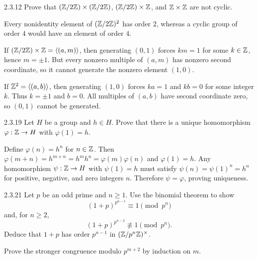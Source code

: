 \documentclass[11pt,oneside]{article}
\begin{document}
\begin{exercise}{2.3.12}
Prove that $(\mathbb{Z}/2\mathbb{Z})\times(\mathbb{Z}/2\mathbb{Z})$, $(\mathbb{Z}/2\mathbb{Z})\times\mathbb{Z}$, and $\mathbb{Z}\times\mathbb{Z}$ are not cyclic.
\end{exercise}

\begin{solution}
\begin{exercisesubparts}
\item Every nonidentity element of $(\mathbb{Z}/2\mathbb{Z})^2$ has order $2$, whereas a cyclic group of order $4$ would have an element of order $4$.
\item If $(\mathbb{Z}/2\mathbb{Z})\times\mathbb{Z}=\langle(a,m)\rangle$, then generating $(0,1)$ forces $km=1$ for some $k\in\mathbb{Z}$, hence $m=\pm1$. But every nonzero multiple of $(a,m)$ has nonzero second coordinate, so it cannot generate the nonzero element $(1,0)$.
\item If $\mathbb{Z}^2=\langle(a,b)\rangle$, then generating $(1,0)$ forces $ka=1$ and $kb=0$ for some integer $k$. Thus $k=\pm1$ and $b=0$. All multiples of $(a,b)$ have second coordinate zero, so $(0,1)$ cannot be generated.
\end{exercisesubparts}
\end{solution}

\begin{exercise}{2.3.19}
Let $H$ be a group and $h\in H$. Prove that there is a unique homomorphism $\varphi:\mathbb{Z}\to H$ with $\varphi(1)=h$.
\end{exercise}

\begin{solution}
Define $\varphi(n)=h^n$ for $n\in\mathbb{Z}$. Then $\varphi(m+n)=h^{m+n}=h^mh^n=\varphi(m)\varphi(n)$ and $\varphi(1)=h$. Any homomorphism $\psi:\mathbb{Z}\to H$ with $\psi(1)=h$ must satisfy $\psi(n)=\psi(1)^n=h^n$ for positive, negative, and zero integers $n$. Therefore $\psi=\varphi$, proving uniqueness.
\end{solution}

\begin{exercise}{2.3.21}
Let $p$ be an odd prime and $n\ge1$. Use the binomial theorem to show
\[
 (1+p)^{p^{n-1}}\equiv1\pmod{p^n}
\]
and, for $n\ge2$,
\[
 (1+p)^{p^{n-2}}\not\equiv1\pmod{p^n}.
\]
Deduce that $1+p$ has order $p^{n-1}$ in $(\mathbb{Z}/p^n\mathbb{Z})^\times$.
\end{exercise}

\begin{hint}
Prove the stronger congruence modulo $p^{m+2}$ by induction on $m$.
\end{hint}
\end{document}
